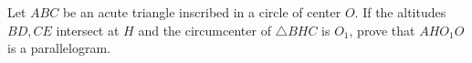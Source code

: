 Let $ABC$ be an acute triangle inscribed in a circle of center $O$. If the altitudes $BD,CE$ intersect at $H$ and the circumcenter of $\triangle BHC$ is $O_1$, prove that $AHO_1O$ is a parallelogram.